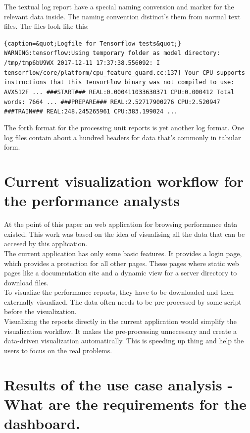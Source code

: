 \documentclass[american,a4paper,oneside,,tablecaptionabove]{scrbook}
\begin{document}
The textual log report have a special naming conversion and marker for
the relevant data inside. The naming convention distinct's them from
normal text files. The files look like this:

\lstinline!{caption=&quot;Logfile for Tensorflow tests&quot;} WARNING:tensorflow:Using temporary folder as model directory: /tmp/tmp6bU9WX 2017-12-11 17:37:38.556092: I tensorflow/core/platform/cpu_feature_guard.cc:137] Your CPU supports instructions that this TensorFlow binary was not compiled to use: AVX512F ... ###START### REAL:0.000411033630371 CPU:0.000412 Total words: 7664 ... ###PREPARE### REAL:2.52717900276 CPU:2.520947 ###TRAIN### REAL:248.245265961 CPU:383.199024 ...!

The forth format for the processing unit reports is yet another log
format. One log files contain about a hundred headers for data that's
commonly in tabular form.

\section{Current visualization workflow for the performance
analysts}\label{current-visualization-workflow-for-the-performance-analysts}

At the point of this paper an web application for browsing performance
data existed. This work was based on the idea of visualising all the
data that can be accesed by this application.\\
The current application has only some basic features. It provides a
login page, which provides a protection for all other pages. These pages
where static web pages like a documentation site and a dynamic view for
a server directory to download files.\\
To visualize the performance reports, they have to be downloaded and
then externally visualized. The data often needs to be pre-processed by
some script before the visualization.\\
Visualizing the reports directly in the current application would
simplify the visualization workflow. It makes the pre-processing
unnecessary and create a data-driven visualization automatically. This
is speeding up thing and help the users to focus on the real problems.

\section{Results of the use case analysis - What are the requirements
for the
dashboard.}\label{results-of-the-use-case-analysis---what-are-the-requirements-for-the-dashboard.}
\end{document}
